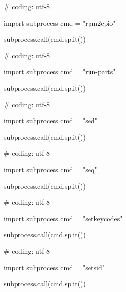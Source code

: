 \begin{mylisting}[label={lst:acpid},language=sh,caption=rpm2cpio]

# coding: utf-8

import subprocess
cmd = "rpm2cpio"

subprocess.call(cmd.split())

\end{mylisting}

\begin{mylisting}[label={lst:acpid},language=sh,caption=run-parts]

# coding: utf-8

import subprocess
cmd = "run-parts"

subprocess.call(cmd.split())

\end{mylisting}

\begin{mylisting}[label={lst:acpid},language=sh,caption=sed]

# coding: utf-8

import subprocess
cmd = "sed"

subprocess.call(cmd.split())

\end{mylisting}

\begin{mylisting}[label={lst:acpid},language=sh,caption=seq]

# coding: utf-8

import subprocess
cmd = "seq"

subprocess.call(cmd.split())

\end{mylisting}

\begin{mylisting}[label={lst:acpid},language=sh,caption=setkeycodes]

# coding: utf-8

import subprocess
cmd = "setkeycodes"

subprocess.call(cmd.split())

\end{mylisting}

\begin{mylisting}[label={lst:acpid},language=sh,caption=setsid]

# coding: utf-8

import subprocess
cmd = "setsid"

subprocess.call(cmd.split())

\end{mylisting}

